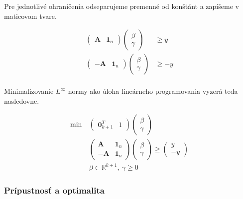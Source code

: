 \documentclass[12pt,oneside,a4paper,slovak]{article}
\begin{document}
Pre jednotlivé ohraničenia odseparujeme premenné od konštánt a zapíšeme v maticovom tvare.

\begin{align*}
	\left(
		\begin{array}{c|c}
			\mathbf{A} & \mathbf{1}_n
		\end{array}
	\right)
	\left(
		\begin{array}{c}
			\beta \\
			\hline
			\gamma
		\end{array}
	\right) & \geq y \\
	\left(
		\begin{array}{c|c}
			-\mathbf{A} & \mathbf{1}_n
		\end{array}
	\right)
	\left(
		\begin{array}{c}
			\beta \\
			\hline
			\gamma
		\end{array}
	\right) &\geq -y \\
\end{align*}

Minimalizovanie $L^{\infty}$ normy ako úloha lineárneho programovania vyzerá teda nasledovne.

\begin{align}
	\text{min}~ &
	\left(
		\begin{array}{c|c}
			\mathbf{0}_{k+1}^T & 1
		\end{array}
	\right)
	\left(
		\begin{array}{c}
			\beta \\
			\hline
			\gamma
		\end{array}
	\right) \nonumber \\
	&\left(
		\begin{array}{c|c}
			\mathbf{A} & \mathbf{1}_n \\
			\hline
			-\mathbf{A} & \mathbf{1}_n
		\end{array}
	\right)
	\left(
		\begin{array}{c}
			\beta \\
			\hline
			\gamma
		\end{array}
	\right)
	\geq
	\left(
		\begin{array}{c}
			y \\
			\hline
			-y
		\end{array}
	\right) \label{Pinf}\\
	&\beta \in \mathbb{R}^{k+1},~\gamma \geq 0 \nonumber
\end{align}

\subsubsection*{Prípustnosť a optimalita}
\end{document}
